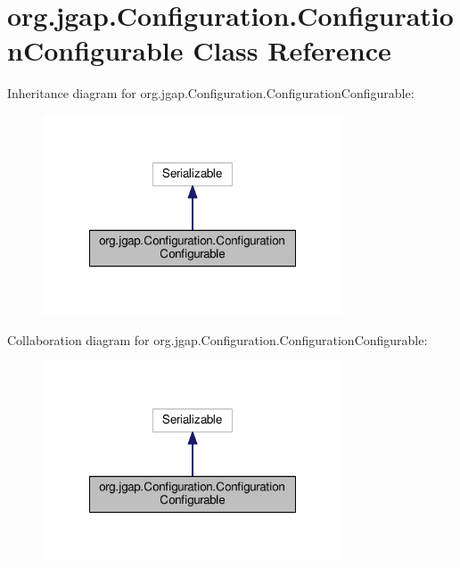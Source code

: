 \hypertarget{classorg_1_1jgap_1_1_configuration_1_1_configuration_configurable}{\section{org.\-jgap.\-Configuration.\-Configuration\-Configurable Class Reference}
\label{classorg_1_1jgap_1_1_configuration_1_1_configuration_configurable}
}


Inheritance diagram for org.\-jgap.\-Configuration.\-Configuration\-Configurable\-:
\nopagebreak
\begin{figure}[H]
\begin{center}
\leavevmode
\includegraphics[width=252pt]{classorg_1_1jgap_1_1_configuration_1_1_configuration_configurable__inherit__graph}
\end{center}
\end{figure}


Collaboration diagram for org.\-jgap.\-Configuration.\-Configuration\-Configurable\-:
\nopagebreak
\begin{figure}[H]
\begin{center}
\leavevmode
\includegraphics[width=252pt]{classorg_1_1jgap_1_1_configuration_1_1_configuration_configurable__coll__graph}
\end{center}
\end{figure}


